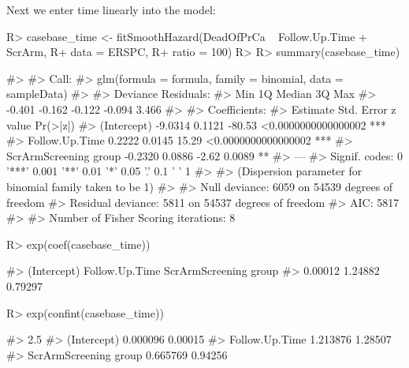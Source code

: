 \documentclass[
]{jss}
\begin{document}
Next we enter time linearly into the model:

\begin{CodeChunk}

\begin{CodeInput}
R> casebase_time <- fitSmoothHazard(DeadOfPrCa ~ Follow.Up.Time + ScrArm, 
R+                                  data = ERSPC, 
R+                                  ratio = 100)
R> 
R> summary(casebase_time)
\end{CodeInput}

\begin{CodeOutput}
#> 
#> Call:
#> glm(formula = formula, family = binomial, data = sampleData)
#> 
#> Deviance Residuals: 
#>    Min      1Q  Median      3Q     Max  
#> -0.401  -0.162  -0.122  -0.094   3.466  
#> 
#> Coefficients:
#>                       Estimate Std. Error z value            Pr(>|z|)    
#> (Intercept)            -9.0314     0.1121  -80.53 <0.0000000000000002 ***
#> Follow.Up.Time          0.2222     0.0145   15.29 <0.0000000000000002 ***
#> ScrArmScreening group  -0.2320     0.0886   -2.62              0.0089 ** 
#> ---
#> Signif. codes:  0 '***' 0.001 '**' 0.01 '*' 0.05 '.' 0.1 ' ' 1
#> 
#> (Dispersion parameter for binomial family taken to be 1)
#> 
#>     Null deviance: 6059  on 54539  degrees of freedom
#> Residual deviance: 5811  on 54537  degrees of freedom
#> AIC: 5817
#> 
#> Number of Fisher Scoring iterations: 8
\end{CodeOutput}

\begin{CodeInput}
R> exp(coef(casebase_time))
\end{CodeInput}

\begin{CodeOutput}
#>           (Intercept)        Follow.Up.Time ScrArmScreening group 
#>               0.00012               1.24882               0.79297
\end{CodeOutput}

\begin{CodeInput}
R> exp(confint(casebase_time))
\end{CodeInput}

\begin{CodeOutput}
#>                          2.5 %
#> (Intercept)           0.000096 0.00015
#> Follow.Up.Time        1.213876 1.28507
#> ScrArmScreening group 0.665769 0.94256
\end{CodeOutput}
\end{CodeChunk}
\end{document}
